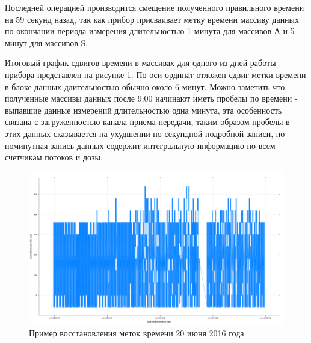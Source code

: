 Последней операцией производится смещение полученного правильного времени на 59 
секунд назад, так как прибор присваивает метку времени массиву данных по окончании периода измерения длительностью 1 минута для массивов А и  5 минут для массивов S. 

Итоговый график сдвигов времени в массивах для одного из дней работы прибора представлен на рисунке \ref{fig:deprontime172}. По оси ординат отложен сдвиг метки времени в блоке данных длительностью обычно около 6 минут. Можно заметить что полученные массивы данных после 9:00 начинают иметь пробелы по времени - выпавшие данные измерений длительностью одна минута, эта особенность связана с загруженностью канала приема-передачи, таким образом пробелы в этих данных сказывается на ухудшении по-секундной подробной записи, но поминутная запись данных содержит интегральную информацию по всем счетчикам потоков и дозы.






\begin{figure}
	\centering
	\includegraphics[width=0.9\linewidth]{images/depron_time_172}
	\caption{Пример восстановления меток времени 20 июня 2016 года}
	\label{fig:deprontime172}
\end{figure}






